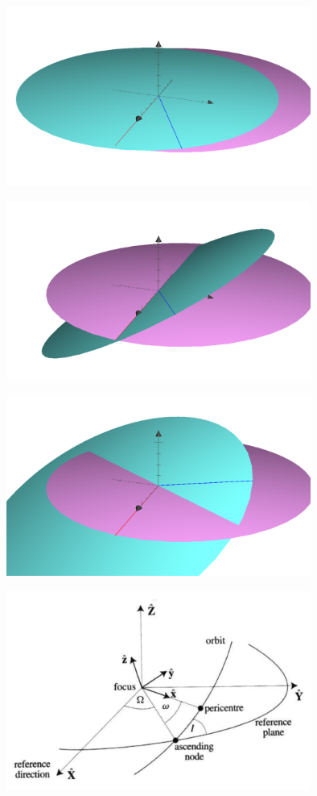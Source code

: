\documentclass[11pt,a4paper,oneside,onecolumn]{jarticle}
\begin{document}
\begin{figure}[H]
\centering
\includegraphics[width=10cm]{./image/ellipse2.pdf}
\caption{\label{}}
\end{figure}

\begin{figure}[H]
\centering
\includegraphics[width=10cm]{./image/ellipse3.pdf}
\caption{\label{}}
\end{figure}

\begin{figure}[H]
\centering
\includegraphics[width=10cm]{./image/ellipse4.pdf}
\caption{\label{}}
\end{figure}

\begin{figure}[H]
\centering
\includegraphics[width=10cm]{./image/sec2_13.pdf}
\caption{\label{}}
\end{figure}
\end{document}

